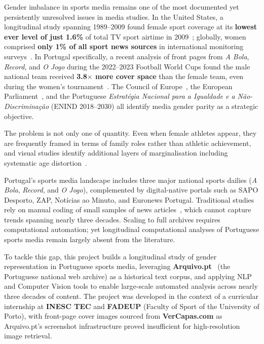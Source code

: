 \documentclass[11pt,a4paper]{article}
\begin{document}
Gender imbalance in sports media remains one of the most documented yet persistently unresolved issues in media studies. In the United States, a longitudinal study spanning 1989–2009 found female sport coverage at its \textbf{lowest ever level of just 1.6\%} of total TV sport airtime in 2009~\cite{Cooky2013}; globally, women comprised \textbf{only 1\% of all sport news sources} in international monitoring surveys~\cite{WACC2010}. In Portugal specifically, a recent analysis of front pages from \textit{A Bola}, \textit{Record}, and \textit{O Jogo} during the 2022–2023 Football World Cups found the male national team received \textbf{3.8$\times$ more cover space} than the female team, even during the women's tournament~\cite{NunesDiFatima2025}. The Council of Europe~\cite{CoE2022}, the European Parliament~\cite{EP2024}, and the Portuguese \textit{Estratégia Nacional para a Igualdade e a Não-Discriminação} (ENIND 2018–2030) all identify media gender parity as a strategic objective.

The problem is not only one of quantity. Even when female athletes appear, they are frequently framed in terms of family roles rather than athletic achievement, and visual studies identify additional layers of marginalisation including systematic age distortion~\cite{WACC2010,Juergens2022}.

Portugal's sports media landscape includes three major national sports dailies (\textit{A Bola}, \textit{Record}, and \textit{O Jogo}), complemented by digital-native portals such as SAPO Desporto, ZAP, Notícias ao Minuto, and Euronews Portugal. Traditional studies rely on manual coding of small samples of news articles~\cite{Fink2015,Cooky2013}, which cannot capture trends spanning nearly three decades. Scaling to full archives requires computational automation; yet longitudinal computational analyses of Portuguese sports media remain largely absent from the literature.

To tackle this gap, this project builds a longitudinal study of gender representation in Portuguese sports media, leveraging \textbf{Arquivo.pt}~\cite{Arquivo} (the Portuguese national web archive) as a historical text corpus, and applying NLP and Computer Vision tools to enable large-scale automated analysis across nearly three decades of content. The project was developed in the context of a curricular internship at \textbf{INESC TEC} and \textbf{FADEUP} (Faculty of Sport of the University of Porto), with front-page cover images sourced from \textbf{VerCapas.com} as Arquivo.pt's screenshot infrastructure proved insufficient for high-resolution image retrieval.
\end{document}
